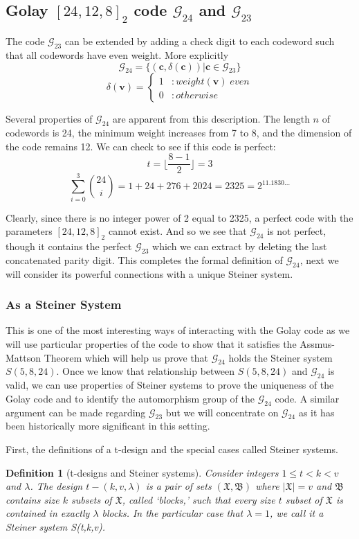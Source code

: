 \documentclass[paper=a4, fontsize=11pt]{scrartcl} %
\numberwithin{equation}{section} %
\numberwithin{figure}{section} %
\numberwithin{table}{section} %
\theoremstyle{break}
\newtheorem{defn}{Definition}
\begin{document}
\subsection{Golay $[24,12,8]_2$ code $\mathcal{G}_{24}$ and $\mathcal{G}_{23}$}
The code $\mathcal{G}_{23}$ can be extended by adding a check digit to each codeword such that all codewords have even weight. More explicitly
$$
\mathcal{G}_{24} = \{ (\textbf{c}, \delta (\textbf{c})) | \textbf{c} \in \mathcal{G}_{23}\}
$$
$$
\delta (\textbf{v}) = \left\{
     \begin{array}{ll}
       1 & : weight(\textbf{v}) \; even\\
       0 & : otherwise
     \end{array}
   \right.
$$

Several properties of $\mathcal{G}_{24}$ are apparent from this description. The length $n$ of codewords is 24, the minimum weight increases from 7 to 8, and the dimension of the code remains 12. We can check to see if this code is perfect:
$$
t = \lfloor \frac{8-1}{2} \rfloor = 3
$$
$$
\sum_{i=0}^{3} {24 \choose i} = 1 + 24 + 276 + 2024 = 2325 = 2^{11.1830\ldots}
$$

Clearly, since there is no integer power of 2 equal to 2325, a perfect code with the parameters $[24,12,8]_2$ cannot exist. And so we see that $\mathcal{G}_{24}$ is not perfect, though it contains the perfect $\mathcal{G}_{23}$ which we can extract by deleting the last concatenated parity digit. This completes the formal definition of $\mathcal{G}_{24}$, next we will consider its powerful connections with a unique Steiner system.

\subsubsection{As a Steiner System}
This is one of the most interesting ways of interacting with the Golay code as we will use particular properties of the code to show that it satisfies the Assmus-Mattson Theorem which will help us prove that $\mathcal{G}_{24}$ holds the Steiner system $S(5,8,24)$. Once we know that relationship between $S(5,8,24)$ and $\mathcal{G}_{24}$ is valid, we can use properties of Steiner systems to prove the uniqueness of the Golay code and to identify the automorphism group of the $\mathcal{G}_{24}$ code. A similar argument can be made regarding $\mathcal{G}_{23}$ but we will concentrate on $\mathcal{G}_{24}$ as it has been historically more significant in this setting.

First, the definitions of a t-design and the special cases called Steiner systems.
\begin{defn}[t-designs and Steiner systems]
Consider integers $1 \leq t < k < v$ and $\lambda$. The design $t-(k,v,\lambda)$ is a pair of sets $(\mathfrak{X},\mathfrak{B})$ where $|\mathfrak{X}|=v$ and $\mathfrak{B}$ contains size $k$ subsets of $\mathfrak{X}$, called `blocks,' such that every size $t$ subset of $\mathfrak{X}$ is contained in exactly $\lambda$ blocks. In the particular case that $\lambda=1$, we call it a \textit{Steiner system} S(t,k,v).
\end{defn}
\end{document}
